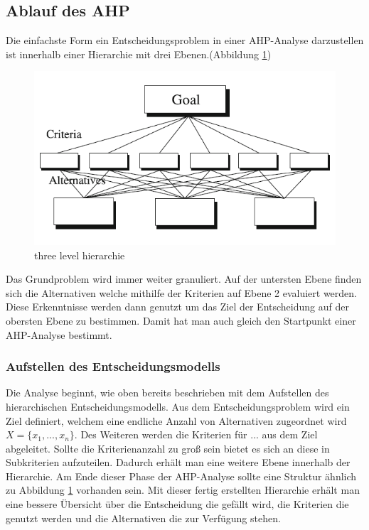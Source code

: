 \subsection{Ablauf des AHP}
Die einfachste Form ein Entscheidungsproblem in einer AHP-Analyse darzustellen ist innerhalb einer Hierarchie mit drei Ebenen.(Abbildung \ref{img:hier})
\begin{figure}[h!]
	\centering
	\includegraphics[scale = 0.8]{img/Hierarchie.png}
	\caption{three level hierarchie}
	\label{img:hier}
\end{figure}
Das Grundproblem wird immer weiter granuliert. Auf der untersten Ebene finden sich die Alternativen welche mithilfe der Kriterien auf Ebene 2 evaluiert werden. Diese Erkenntnisse werden dann genutzt um das Ziel der Entscheidung auf der obersten Ebene zu bestimmen.\autocite[Vgl.][S.2]{Saaty.2012}
Damit hat man auch gleich den Startpunkt einer AHP-Analyse bestimmt. 
\subsubsection{Aufstellen des Entscheidungsmodells}
Die Analyse beginnt, wie oben bereits beschrieben mit dem Aufstellen des hierarchischen Entscheidungsmodells. Aus dem Entscheidungsproblem wird ein Ziel definiert, welchem eine endliche Anzahl von Alternativen zugeordnet wird $X=\{x_{1}, ..., x_{n}\}$\autocite[Vgl.][S.3]{Brunelli.2015}.
Des Weiteren werden die Kriterien für ... aus dem Ziel abgeleitet. Sollte die Kriterienanzahl zu groß sein bietet es sich an diese in Subkriterien aufzuteilen. Dadurch erhält man eine weitere Ebene innerhalb der Hierarchie. Am Ende dieser Phase der AHP-Analyse sollte eine Struktur ähnlich zu Abbildung \ref{img:hier} vorhanden sein. Mit dieser fertig erstellten Hierarchie erhält man eine bessere Übersicht über die Entscheidung die gefällt wird, die Kriterien die genutzt werden und die Alternativen die zur Verfügung stehen.\autocite[Vgl.][S.9]{Mu.2018} 
